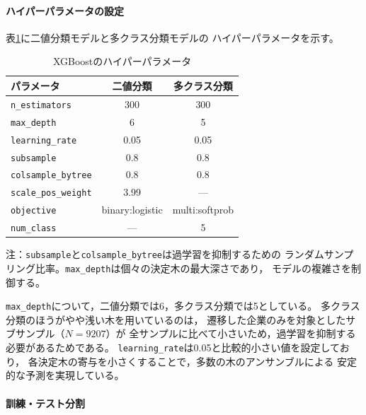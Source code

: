 \paragraph{ハイパーパラメータの設定}

表\ref{tab:xgb-params}に二値分類モデルと多クラス分類モデルの
ハイパーパラメータを示す。

\begin{table}[htbp]
  \centering
  \caption{XGBoostのハイパーパラメータ}
  \label{tab:xgb-params}
  \begin{tabular}{lcc}
    \toprule
    パラメータ & 二値分類 & 多クラス分類 \\
    \midrule
    \texttt{n\_estimators}      & 300           & 300 \\
    \texttt{max\_depth}         & 6             & 5 \\
    \texttt{learning\_rate}     & 0.05          & 0.05 \\
    \texttt{subsample}          & 0.8           & 0.8 \\
    \texttt{colsample\_bytree}  & 0.8           & 0.8 \\
    \texttt{scale\_pos\_weight} & 3.99          & --- \\
    \texttt{objective}          & binary:logistic & multi:softprob \\
    \texttt{num\_class}         & ---           & 5 \\
    \bottomrule
  \end{tabular}
  \begin{tablenotes}
    \small
    \item 注：\texttt{subsample}と\texttt{colsample\_bytree}は過学習を抑制するための
    ランダムサンプリング比率。\texttt{max\_depth}は個々の決定木の最大深さであり，
    モデルの複雑さを制御する。
  \end{tablenotes}
\end{table}

\texttt{max\_depth}について，二値分類では6，多クラス分類では5としている。
多クラス分類のほうがやや浅い木を用いているのは，
遷移した企業のみを対象としたサブサンプル（$N = \num{9207}$）が
全サンプルに比べて小さいため，過学習を抑制する必要があるためである。
\texttt{learning\_rate}は0.05と比較的小さい値を設定しており，
各決定木の寄与を小さくすることで，多数の木のアンサンブルによる
安定的な予測を実現している。

\paragraph{訓練・テスト分割}

